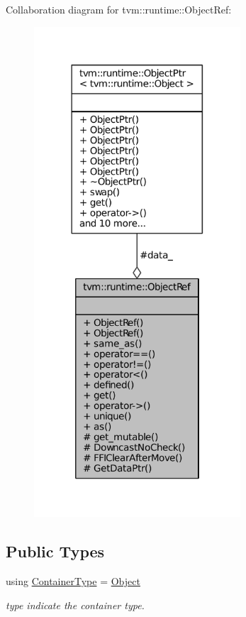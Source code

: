Collaboration diagram for tvm\+:\+:runtime\+:\+:Object\+Ref\+:
\nopagebreak
\begin{figure}[H]
\begin{center}
\leavevmode
\includegraphics[width=218pt]{classtvm_1_1runtime_1_1ObjectRef__coll__graph}
\end{center}
\end{figure}
\subsection*{Public Types}
\begin{DoxyCompactItemize}
\item 
using \hyperlink{classtvm_1_1runtime_1_1ObjectRef_aa5c355fbb7d2f7402ee360dba8a52cdd}{Container\+Type} = \hyperlink{classtvm_1_1runtime_1_1Object}{Object}
\begin{DoxyCompactList}\small\item\em type indicate the container type. \end{DoxyCompactList}\end{DoxyCompactItemize}
